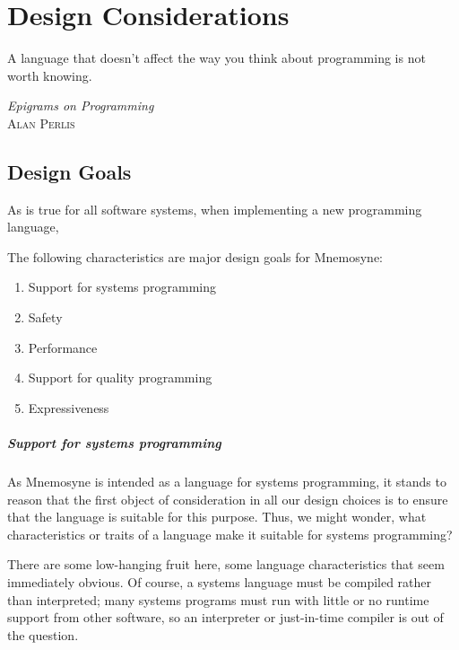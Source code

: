 %
%
%
\chapter{Design Considerations} \label{ch:design}

\epigraph{ A language that doesn't affect the way you think about programming
           is not worth knowing. }%
         { \textit{Epigrams on Programming}~\cite{Perlis:1982:SFE:947955.1083808} \\
          \textsc{Alan Perlis}}


\section{Design Goals} \label{sec:goals}

As is true for all software systems, when implementing a new programming language,

The following characteristics are major design goals for Mnemosyne:
\begin{enumerate}
    \item Support for systems programming
    \item Safety
    \item Performance
    \item Support for quality programming
    \item Expressiveness
\end{enumerate}

\paragraph{Support for systems programming}

As Mnemosyne is intended as a language for systems programming, it stands to reason that the first object of consideration in all our design choices is to ensure that the language is suitable for this purpose. Thus, we might wonder, what characteristics or traits of a language make it suitable for systems programming?

There are some low-hanging fruit here, some language characteristics that seem immediately obvious. Of course, a systems language must be compiled rather than interpreted; many systems programs must run with little or no runtime support from other software, so an interpreter or just-in-time compiler is out of the question.


